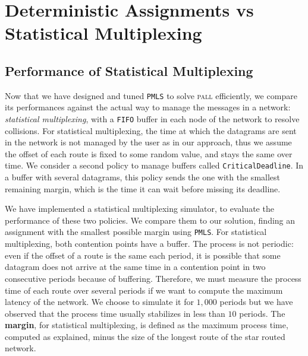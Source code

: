 \documentclass[a4paper,10pt]{journal}
\newcommand\PMLS{\texttt{PMLS}\xspace}
\newcommand\FIFO{\texttt{FIFO}\xspace}
\newcommand\critdead{\texttt{CriticalDeadline}\xspace}
\newcommand\pall{\textsc{pall}\xspace}
\begin{document}
\section{Deterministic Assignments vs Statistical Multiplexing}\label{sec:comparison}

    \subsection{Performance of Statistical Multiplexing}


      Now that we have designed and tuned \PMLS to solve \pall efficiently, we compare its performances against the actual way to manage the messages in a network:  \emph{statistical multiplexing}, with a \FIFO buffer in each node of the network to resolve collisions. For statistical multiplexing, the time at which the datagrams are sent in the network is not managed by the user as in our approach, thus we assume the offset of each route is fixed to some random value, and stays the same over time.
      We consider a second policy to manage buffers called \critdead. In a buffer with several datagrams, this policy sends the one with the smallest remaining margin, which is the time it can wait before missing its deadline.


    We have implemented a statistical multiplexing simulator, to evaluate the performance of these two policies. We compare them to our solution, finding an assignment with the smallest possible margin using \PMLS. 
    For statistical multiplexing, both contention points have a buffer. The process is not periodic:
    even if the offset of a route is the same each period, it is possible that some datagram does not arrive at the same time in a contention point in two consecutive periods because of buffering. Therefore, we must measure the process time of each route over several periods if we want to compute the maximum latency of the network. We choose to simulate it for $1,000$ periods but we have observed that the process time usually stabilizes in less than $10$ periods. The \textbf{margin}, for statistical multiplexing, is defined as the maximum process time, computed as explained, minus the size of the longest route of the star routed network. 

\end{document}
